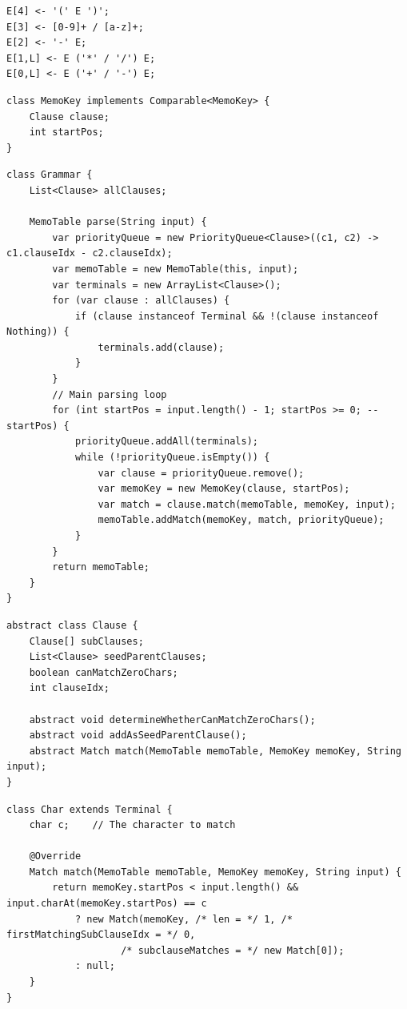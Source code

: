 \documentclass[manuscript,screen]{acmart}
\begin{document}
\begin{lstlisting}[caption={Shorthand reference parser notation for the grammar of Listing~\ref{lst:grammarFixed}},label={lst:grammarRefParserSyntax}]
E[4] <- '(' E ')';
E[3] <- [0-9]+ / [a-z]+;
E[2] <- '-' E;
E[1,L] <- E ('*' / '/') E;
E[0,L] <- E ('+' / '-') E;
\end{lstlisting}

\begin{lstlisting}[caption={The \texttt{MemoKey} class},label={lst:MemoKey}]
class MemoKey implements Comparable<MemoKey> {
    Clause clause;
    int startPos;
}
\end{lstlisting}

\begin{lstlisting}[caption={The \texttt{Grammar} class (which contains the main \texttt{parse} method)},label={lst:Grammar}]
class Grammar {
    List<Clause> allClauses;

    MemoTable parse(String input) {
        var priorityQueue = new PriorityQueue<Clause>((c1, c2) -> c1.clauseIdx - c2.clauseIdx);
        var memoTable = new MemoTable(this, input);
        var terminals = new ArrayList<Clause>();
        for (var clause : allClauses) {
            if (clause instanceof Terminal && !(clause instanceof Nothing)) {
                terminals.add(clause);
            }
        }
        // Main parsing loop
        for (int startPos = input.length() - 1; startPos >= 0; --startPos) {
            priorityQueue.addAll(terminals);
            while (!priorityQueue.isEmpty()) {
                var clause = priorityQueue.remove();
                var memoKey = new MemoKey(clause, startPos);
                var match = clause.match(memoTable, memoKey, input);
                memoTable.addMatch(memoKey, match, priorityQueue);
            }
        }
        return memoTable;
    }
}
\end{lstlisting}

\begin{lstlisting}[caption={The \texttt{Clause} class},label={lst:Clause}]
abstract class Clause {
    Clause[] subClauses;
    List<Clause> seedParentClauses;
    boolean canMatchZeroChars;
    int clauseIdx;

    abstract void determineWhetherCanMatchZeroChars();
    abstract void addAsSeedParentClause();
    abstract Match match(MemoTable memoTable, MemoKey memoKey, String input);
}
\end{lstlisting}

\newpage

\begin{lstlisting}[caption={The implementation of the \texttt{Char} terminal (\texttt{Terminal} extends \texttt{Clause})},label={lst:Char}]
class Char extends Terminal {
    char c;    // The character to match

    @Override
    Match match(MemoTable memoTable, MemoKey memoKey, String input) {
        return memoKey.startPos < input.length() && input.charAt(memoKey.startPos) == c
            ? new Match(memoKey, /* len = */ 1, /* firstMatchingSubClauseIdx = */ 0,
                    /* subclauseMatches = */ new Match[0]);
            : null;
    }
}
\end{lstlisting}
\end{document}

